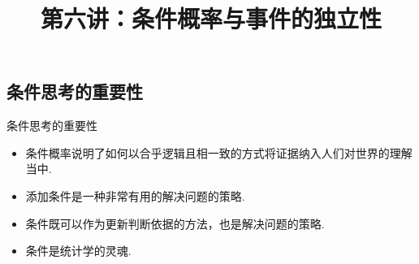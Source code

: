 

\title[概率论]{第六讲：条件概率与事件的独立性}
\date{}


{
	\begin{frame}
		\titlepage
	\end{frame}
}


\subsection{条件思考的重要性}%

\begin{frame}{条件思考的重要性}
	\begin{itemize}[<+-|alert@+>]
		\item 条件概率说明了如何以合乎逻辑且相一致的方式将证据纳入人们对世界的理解当中.
        \item 添加条件是一种非常有用的解决问题的策略.
        \item 条件既可以作为更新判断依据的方法，也是解决问题的策略.
        \item 条件是统计学的灵魂.
	\end{itemize}

\end{frame}

